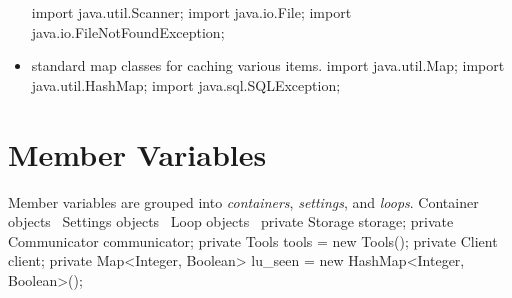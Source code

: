 \begin{itemize}
\nwenddocs{}\plusendmoddef
import java.util.Scanner;
import java.io.File;
import java.io.FileNotFoundException;
\nwendcode{}\item standard map classes for caching various items.
\nwenddocs{}\plusendmoddef
import java.util.Map;
import java.util.HashMap;
\nwendcode{}\nwdocspar
\nwenddocs{}\plusendmoddef
import java.sql.SQLException;
\nwendcode{}\nwdocspar
\end{itemize}

\section{Member Variables}
Member variables are grouped into \emph{containers}, \emph{settings}, and
\emph{loops}.
\nwenddocs{}\endmoddef{}
\LA{}Container objects~{\nwtagstyle{}}\RA{}
\LA{}Settings objects~{\nwtagstyle{}}\RA{}
\LA{}Loop objects~{\nwtagstyle{}}\RA{}
\nwendcode{}\nwdocspar
{}
\nwenddocs{}\endmoddef{}
private Storage storage;
private Communicator communicator;
private Tools tools = new Tools();
private Client client;
private Map<Integer, Boolean> lu_seen = new HashMap<Integer, Boolean>();
\nwendcode{}\nwdocspar


